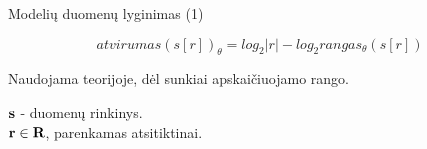 \begin{frame}[c]{Modelių duomenų lyginimas (1)}
 
 \begin{equation}
     atvirumas(s[r])_{\theta} = log_{2}|r| - log_{2} rangas_{\theta}(s[r])
 \end{equation}
 
Naudojama teorijoje, dėl sunkiai apskaičiuojamo rango.

$\bf s$ - duomenų rinkinys. \\
$\bf r \in R$, parenkamas atsitiktinai.

\end{frame}